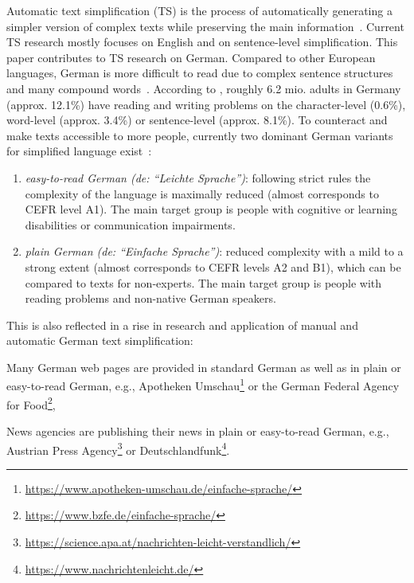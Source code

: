 \documentclass[11pt]{article}
\begin{document}
Automatic text simplification (TS) is the process of automatically generating a simpler version of complex texts while preserving the main information~\cite{alva-manchego-etal-2020-data}. Current TS research mostly focuses on English and on sentence-level simplification. This paper contributes to TS research on German. Compared to other European languages, German is 
 more difficult to read due to complex sentence structures and 
  many compound words~\cite{marzari-2010-leichtes}. According to 
   \citet{buddeberg-grotluschen-2020-leo}, roughly 6.2 mio. adults in Germany (approx. 12.1\%) have reading and writing problems on the character-level (0.6\%), word-level (approx. 3.4\%) or sentence-level (approx. 8.1\%). 
 To counteract and make texts accessible to more people, currently two dominant German variants for simplified language exist~\cite{maass-2020-easy}:
\begin{enumerate}\item \emph{easy-to-read German (de: ``Leichte Sprache'')}: following strict rules  the complexity of the language is maximally reduced (almost corresponds to CEFR level A1). 
    The main target group is people with cognitive or learning disabilities or communication impairments.
    \item \emph{plain German (de: ``Einfache Sprache'')}: reduced complexity with a mild to a strong extent (almost corresponds to CEFR levels A2 and B1), which can be compared to texts for non-experts. The main target group is people with reading problems and non-native German speakers.
\end{enumerate} 
This is also reflected in a rise in research and application of manual and automatic German text simplification:
\begin{enumerate*}[label=\roman*)]
    \item Many German web pages are provided in 
     standard German as well as in 
      plain or easy-to-read German, e.g., Apotheken Umschau\footnote{\href{https://www.apotheken-umschau.de/einfache-sprache/}{https://www.apotheken-umschau.de/einfache-sprache/}} or the German Federal Agency for Food\footnote{\href{https://www.bzfe.de/einfache-sprache/}{https://www.bzfe.de/einfache-sprache/}}, 
    \item News agencies are publishing their news in plain or easy-to-read German, e.g., Austrian Press Agency\footnote{\href{https://science.apa.at/nachrichten-leicht-verstandlich/}{https://science.apa.at/nachrichten-leicht-verstandlich/}} or Deutschlandfunk\footnote{\href{https://www.nachrichtenleicht.de/}{https://www.nachrichtenleicht.de/}}.
\end{enumerate*}
\end{document}
